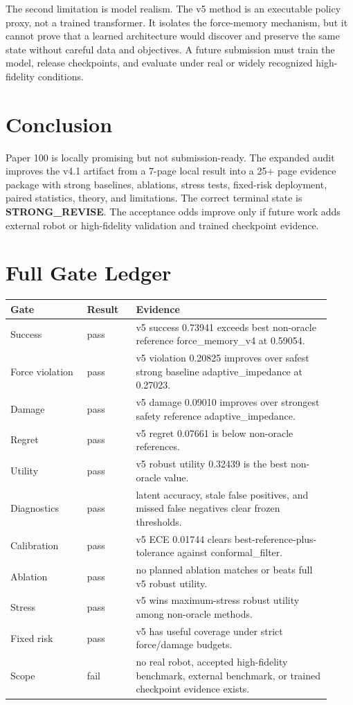 \documentclass{article}
\begin{document}
The second limitation is model realism. The v5 method is an executable policy proxy, not a trained transformer. It isolates the force-memory mechanism, but it cannot prove that a learned architecture would discover and preserve the same state without careful data and objectives. A future submission must train the model, release checkpoints, and evaluate under real or widely recognized high-fidelity conditions.

\section{Conclusion}
Paper 100 is locally promising but not submission-ready. The expanded audit improves the v4.1 artifact from a 7-page local result into a 25+ page evidence package with strong baselines, ablations, stress tests, fixed-risk deployment, paired statistics, theory, and limitations. The correct terminal state is \textbf{STRONG\_REVISE}. The acceptance odds improve only if future work adds external robot or high-fidelity validation and trained checkpoint evidence.

\appendix
\section{Full Gate Ledger}
\begin{longtable}{p{0.22\linewidth}p{0.14\linewidth}p{0.56\linewidth}}
\toprule
Gate & Result & Evidence \\
\midrule
Success & pass & v5 success 0.73941 exceeds best non-oracle reference force\_memory\_v4 at 0.59054. \\
Force violation & pass & v5 violation 0.20825 improves over safest strong baseline adaptive\_impedance at 0.27023. \\
Damage & pass & v5 damage 0.09010 improves over strongest safety reference adaptive\_impedance. \\
Regret & pass & v5 regret 0.07661 is below non-oracle references. \\
Utility & pass & v5 robust utility 0.32439 is the best non-oracle value. \\
Diagnostics & pass & latent accuracy, stale false positives, and missed false negatives clear frozen thresholds. \\
Calibration & pass & v5 ECE 0.01744 clears best-reference-plus-tolerance against conformal\_filter. \\
Ablation & pass & no planned ablation matches or beats full v5 robust utility. \\
Stress & pass & v5 wins maximum-stress robust utility among non-oracle methods. \\
Fixed risk & pass & v5 has useful coverage under strict force/damage budgets. \\
Scope & fail & no real robot, accepted high-fidelity benchmark, external benchmark, or trained checkpoint evidence exists. \\
\bottomrule
\end{longtable}
\end{document}
